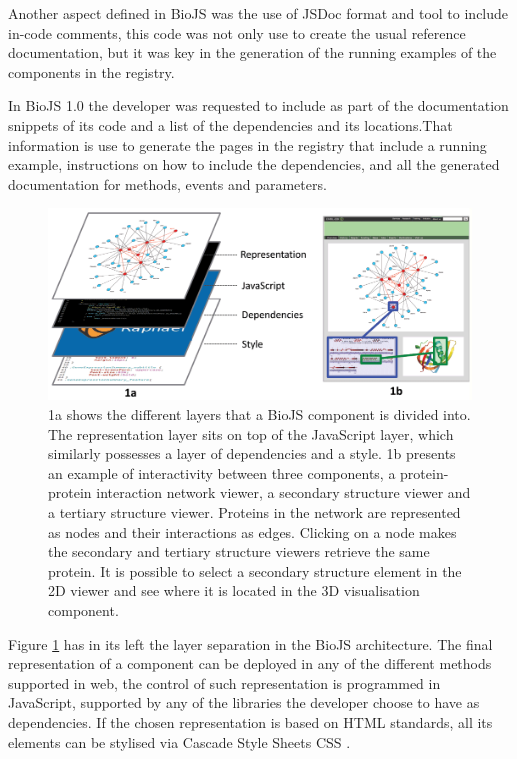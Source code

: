 Another aspect defined in BioJS was the use of JSDoc format and tool to include in-code comments, this code was not only use to create the usual reference documentation, but it was key in the generation of the running examples of the components in the registry. 

In BioJS 1.0 the developer was requested to include as part of the documentation snippets of its code and a list of the dependencies and its locations.That information is use to generate the pages in the registry that include a running example, instructions on how to include the dependencies, and all the generated documentation for methods, events and parameters.

\begin{figure}  
\centering
\includegraphics[width=\textwidth]{figures/biojs_layers.png}
\caption[BioJS layers.]{1a shows the different layers that a BioJS component is divided into. The representation layer sits on top of the JavaScript layer, which similarly possesses a layer of dependencies and a style. 1b presents an example of interactivity between three components, a protein-protein interaction network viewer, a secondary structure viewer and a tertiary structure viewer. Proteins in the network are represented as nodes and their interactions as edges. Clicking on a node makes the secondary and tertiary structure viewers retrieve the same protein. It is possible to select a secondary structure element in the 2D viewer and see where it is located in the 3D visualisation component.
\label{fig:biojs_layers}}
\end{figure}
 
Figure \ref{fig:biojs_layers} has in its left the layer separation in the BioJS architecture. The final representation of a component can be deployed in any of the different methods supported in web, the control of such representation is programmed in JavaScript, supported by any of the libraries the developer choose to have as dependencies. If the chosen representation is based on HTML standards, all its elements can be stylised via Cascade Style Sheets CSS \cite{COR2014}.

